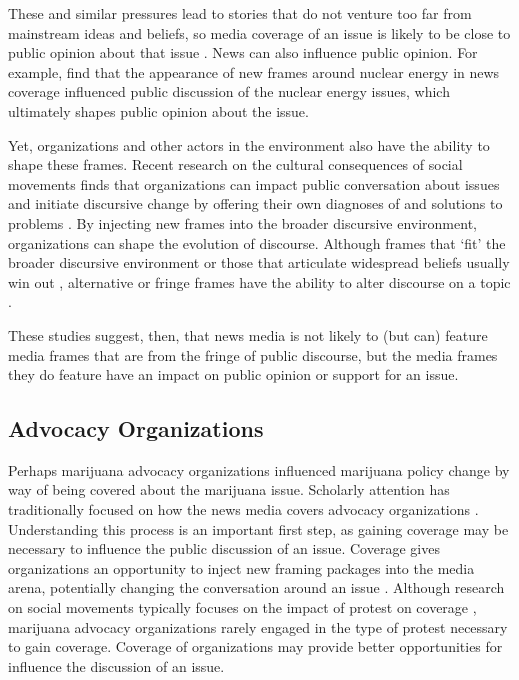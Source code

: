 These and similar pressures lead to stories that do not venture too far from mainstream ideas and beliefs, so media coverage of an issue is likely to be close to public opinion about that issue \citep{gamson_and_modigliani_1989}. News can also influence public opinion. For example, \citep{gamson_and_modigliani_1989} find that the appearance of new frames around nuclear energy in news coverage influenced public discussion of the nuclear energy issues, which ultimately shapes public opinion about the issue.

Yet, organizations and other actors in the environment also have the ability to shape these frames. Recent research on the cultural consequences of social movements \citep{earl_2004} finds that organizations can impact public conversation about issues \citep{bail_et_al_2017} and initiate discursive change by offering their own diagnoses of and solutions to problems \citep{bail_2012,snow_et_al_2007,benford_and_snow_2000}. By injecting new frames into the broader discursive environment, organizations can shape the evolution of discourse. Although frames that `fit' the broader discursive environment \citep{mccammon_et_al_2007} or those that articulate widespread beliefs usually win out \citep{mccammon_et_al_2001,snow_et_al_2007,gamson_and_modigliani_1989}, alternative or fringe frames have the ability to alter discourse on a topic \citep{bail_2012}.

These studies suggest, then, that news media is not likely to (but can) feature media frames that are from the fringe of public discourse, but the media frames they do feature have an impact on public opinion or support for an issue. 

\subsection{Advocacy Organizations}

Perhaps marijuana advocacy organizations influenced marijuana policy change by way of being covered about the marijuana issue. Scholarly attention has traditionally focused on how the news media covers advocacy organizations \citep{amenta_et_al_2009,andrews_and_caren_2010}. Understanding this process is an important first step, as gaining coverage may be necessary to influence the public discussion of an issue. Coverage gives organizations an opportunity to inject new framing packages into the media arena, potentially changing the conversation around an issue \citep{gamson_and_modigliani_1989}. Although research on social movements typically focuses on the impact of protest on coverage \citep{earl_et_al_2004,oliver_and_myers_1999}, marijuana advocacy organizations rarely engaged in the type of protest necessary to gain coverage. Coverage of organizations may provide better opportunities for influence the discussion of an issue. 


